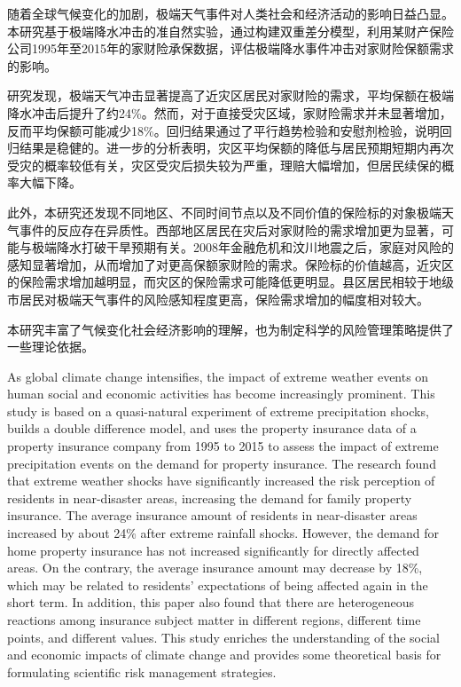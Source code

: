 \begin{cabstract}
    随着全球气候变化的加剧，极端天气事件对人类社会和经济活动的影响日益凸显。本研究基于极端降水冲击的准自然实验，通过构建双重差分模型，利用某财产保险公司1995年至2015年的家财险承保数据，评估极端降水事件冲击对家财险保额需求的影响。

    研究发现，极端天气冲击显著提高了近灾区居民对家财险的需求，平均保额在极端降水冲击后提升了约24\%。然而，对于直接受灾区域，家财险需求并未显著增加，反而平均保额可能减少18\%。回归结果通过了平行趋势检验和安慰剂检验，说明回归结果是稳健的。进一步的分析表明，灾区平均保额的降低与居民预期短期内再次受灾的概率较低有关，灾区受灾后损失较为严重，理赔大幅增加，但居民续保的概率大幅下降。

    此外，本研究还发现不同地区、不同时间节点以及不同价值的保险标的对象极端天气事件的反应存在异质性。西部地区居民在灾后对家财险的需求增加更为显著，可能与极端降水打破干旱预期有关。2008年金融危机和汶川地震之后，家庭对风险的感知显著增加，从而增加了对更高保额家财险的需求。保险标的价值越高，近灾区的保险需求增加越明显，而灾区的保险需求可能降低更明显。县区居民相较于地级市居民对极端天气事件的风险感知程度更高，保险需求增加的幅度相对较大。

    本研究丰富了气候变化社会经济影响的理解，也为制定科学的风险管理策略提供了一些理论依据。
\end{cabstract}
\begin{eabstract}
    As global climate change intensifies, the impact of extreme weather events on human social and economic activities has become increasingly prominent. This study is based on a quasi-natural experiment of extreme precipitation shocks, builds a double difference model, and uses the property insurance data of a property insurance company from 1995 to 2015 to assess the impact of extreme precipitation events on the demand for property insurance. The research found that extreme weather shocks have significantly increased the risk perception of residents in near-disaster areas, increasing the demand for family property insurance. The average insurance amount of residents in near-disaster areas increased by about 24\% after extreme rainfall shocks. However, the demand for home property insurance has not increased significantly for directly affected areas. On the contrary, the average insurance amount may decrease by 18\%, which may be related to residents' expectations of being affected again in the short term. In addition, this paper also found that there are heterogeneous reactions among insurance subject matter in different regions, different time points, and different values. This study enriches the understanding of the social and economic impacts of climate change and provides some theoretical basis for formulating scientific risk management strategies.
\end{eabstract}
